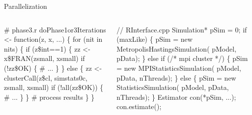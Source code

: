 \documentclass[]{beamer}                                                %
\def\scriptsize{\fontsize{7pt}{8pt}\selectfont}
\begin{document}
\begin{frame}[fragile,t]{Parallelization}                               %
  \def\fIf{1}
  \def\fSim{2}
  \vspace{1.5em}
  \begin{columns}
    \begin{semiverbatim}\scriptsize
# phase3.r
doPhase1or3Iterations <- function(z, x, ...)
\{
  for (nit in nits) \{
    if (z\$int==1) \{
      zz <- x\$FRAN(zsmall, xsmall)
      if (!zz\$OK) \{
        # ...
      \}
    \} else \{
      zz <- clusterCall(z\$cl,
        simstats0c, zsmall, xsmall)
      if (!all(zz\$OK)) \{
        # ...
      \}
    \}
    \alert<\fSim>{# process results}
  \}
\}
    \end{semiverbatim}%

    \begin{semiverbatim}\scriptsize
// RInterface.cpp
Simulation* pSim = 0;
\alert<\fIf>{if} (maxLike) \{
  pSim = new MetropolisHastingsSimulation(
             pModel, pData);
\} \alert<\fIf>{else if} (/* mpi cluster */) \{
  pSim = new MPIStatisticsSimulation(
             pModel, pData, nThreads);
\} \alert<\fIf>{else} \{
  pSim = new StatisticsSimulation(
             pModel, pData, nThreads);
\}
Estimator con(\alert<\fIf>{*pSim}, ...);
con.estimate();
    \end{semiverbatim}
  \end{columns}


\end{frame}
\end{document}
